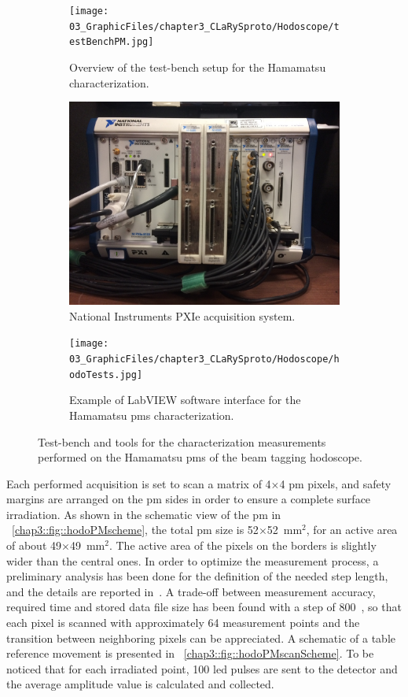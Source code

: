  
\begin{figure}
\begin{subfigure}[t]{1\textwidth}
\centering
\texttt{[image: 03\_GraphicFiles/chapter3\_CLaRySproto/Hodoscope/testBenchPM.jpg]}
\caption{Overview of the test-bench setup for the Hamamatsu  characterization.}
\label{chap3::fig::hodo_testBenchPM}
\end{subfigure}
\newline
\begin{subfigure}[t]{.5\textwidth}
\centering
\includegraphics[width=1\textwidth, height = 5.cm]{03_GraphicFiles/chapter3_CLaRySproto/Electronics_Acquisition/PXI_ipnl.jpg}
\caption{National Instruments PXIe acquisition system.}
\label{chap3::fig::PXI_NI}
\end{subfigure}
\begin{subfigure}[t]{.5\textwidth}
\centering
\texttt{[image: 03\_GraphicFiles/chapter3\_CLaRySproto/Hodoscope/hodoTests.jpg]}
\caption{Example of LabVIEW software interface for the Hamamatsu 	\glspl{pm} characterization.}
\label{chap3::fig::hodo_LabView}
\end{subfigure}
\caption{Test-bench and tools for the characterization measurements performed on the Hamamatsu \glspl{pm} of the beam tagging hodoscope.}
\label{chap3::fig::hodoPMtest}
\end{figure}

Each performed acquisition is set to scan a matrix of 4$\times$4 \gls{pm} pixels, and safety margins are arranged on the \gls{pm} sides in order to ensure a complete surface irradiation. As shown in the schematic view of the \gls{pm} in \figurename~\ref{chap3::fig::hodoPMscheme}, the total \gls{pm} size is 52$\times$52~mm$^{2}$, for an active area of about 49$\times$49~mm$^{2}$. The active area of the pixels on the borders is slightly wider than the central ones. In order to optimize the measurement process, a preliminary analysis has been done for the definition of the needed step length, and the details are reported in~\cite{Coudurier2015}. A trade-off between measurement accuracy, required time and stored data file size has been found with a step of 800~\charmum, so that each pixel is scanned with approximately 64 measurement points and the transition between neighboring pixels can be appreciated. A schematic of a table reference movement is presented in \figurename~\ref{chap3::fig::hodoPMscanScheme}. To be noticed that for each irradiated point, 100 \gls{led} pulses are sent to the detector and the average amplitude value is calculated and collected.
 
